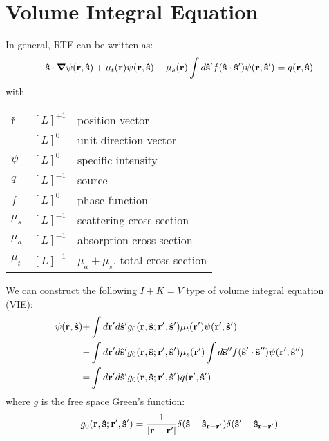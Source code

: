 \documentclass[main]{subfiles}
\begin{document}
\section{Volume Integral Equation}
\label{sec:2d volume integral equation}

In general, RTE can be written as:
\begin{equation*}
	\mathbf{\hat{s}}\cdot\mbox{\boldmath$ \nabla $} \psi(\mathbf{r},\mathbf{\hat{s}})
	+\mu_t(\mathbf{r})\psi(\mathbf{r},\mathbf{\hat{s}})
	-\mu_s(\mathbf{r})\int d\mathbf{\hat{s}}^\prime
	f(\mathbf{\hat{s}}\cdot\mathbf{\hat{s}}^{\prime})\psi(\mathbf{r},\mathbf{\hat{s}}^{\prime})
	=q(\mathbf{r},\mathbf{\hat{s}})
\end{equation*}
with
\begin{center} \begin{tabular}{lll}
	\v{r}	&	$[L]^{+1}$	& position vector		\\
	\uv{s}	&	$[L]^{0}$	& unit direction vector		\\
	$\psi$	&	$[L]^{0}$	& specific intensity		\\
	$q$	&	$[L]^{-1}$	& source			\\
	$f$	&	$[L]^{0}$	& phase function		\\
	$\mu_s$	&	$[L]^{-1}$	& scattering cross-section	\\
	$\mu_a$	&	$[L]^{-1}$	& absorption cross-section	\\
	$\mu_t$	&	$[L]^{-1}$	& $\mu_a+\mu_s$, total cross-section	\\
\end{tabular} \end{center}

We can construct the following $I+K=V$ type of volume integral equation (VIE):
\begin{equation} \label{vie}
	\begin{split}
		\psi(\mathbf{r},\mathbf{\hat{s}}) +& \int d\mathbf{r}^{\prime} d\mathbf{\hat{s}}^{\prime}
		g_0(\mathbf{r},\mathbf{\hat{s}};\mathbf{r}^{\prime},\mathbf{\hat{s}}^{\prime})
		\mu_t(\mathbf{r}^{\prime})\psi(\mathbf{r}^{\prime},\mathbf{\hat{s}}^{\prime})
		\\
		-& \int d\mathbf{r}^{\prime} d\mathbf{\hat{s}}^{\prime} g_0(\mathbf{r},\mathbf{\hat{s}};\mathbf{r}^{\prime},\mathbf{\hat{s}}^{\prime})
		\mu_s(\mathbf{r}^{\prime}) \int d\mathbf{\hat{s}}^{{\prime\prime}}
		f(\mathbf{\hat{s}}^{\prime}\cdot\mathbf{\hat{s}}^{{\prime\prime}})\psi(\mathbf{r}^{\prime},\mathbf{\hat{s}}^{{\prime\prime}})
		\\
		=& \int d\mathbf{r}^{\prime} d\mathbf{\hat{s}}^{\prime}
		g_0(\mathbf{r},\mathbf{\hat{s}};\mathbf{r}^{\prime},\mathbf{\hat{s}}^{\prime})q(\mathbf{r}^{\prime},\mathbf{\hat{s}}^{\prime})
	\end{split}
\end{equation}
where $g$ is the free space Green's function:
\begin{equation} \label{g0}
	g_0(\mathbf{r},\mathbf{\hat{s}};\mathbf{r}^{\prime},\mathbf{\hat{s}}^{\prime}) = \frac{1}{\left| \mathbf{r}-\mathbf{r}^{\prime} \right|} 
	\delta(\mathbf{\hat{s}}-\mathbf{\hat{s}}_{\mathbf{r}-\mathbf{r}^{\prime}})
	\delta(\mathbf{\hat{s}}^{\prime}-\mathbf{\hat{s}}_{\mathbf{r}-\mathbf{r}^{\prime}})
\end{equation}
\end{document}
